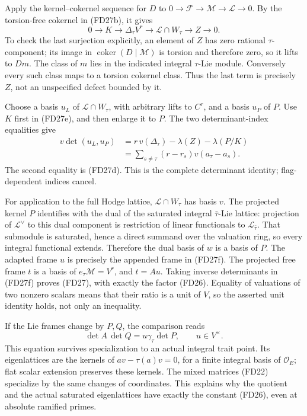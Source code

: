 Apply the kernel--cokernel sequence for \(D\) to
\(0\to\mathscr F\to\mathscr M\to\mathscr L\to0\).
By the torsion-free cokernel in (FD27b), it gives
\[
 0\to K\to\Delta_\tau V^r
          \to\mathscr L\cap W_\tau\to Z\to0 .
 \tag{FD27e}
\]
To check the last surjection explicitly, an element of \(Z\)
has zero rational \(\tau\)-component; its image in
\(\operatorname{coker}(D\mid\mathscr M)\) is torsion and
therefore zero, so it lifts to \(D m\).
The class of \(m\) lies in the indicated integral
\(\tau\)-Lie module.
Conversely every such class maps to a torsion cokernel class.
Thus the last term is precisely \(Z\), not an unspecified
defect bounded by it.

Choose a basis \(u_L\) of \(\mathscr L\cap W_\tau\), with
arbitrary lifts to \(C^r\), and a basis \(u_P\) of \(P\).
Use \(K\) first in (FD27e), and then enlarge it to \(P\).
The two determinant-index equalities give
\[
 \begin{split}
 v\det(u_L,u_P)
  &=r\,v(\Delta_\tau)-\lambda(Z)-\lambda(P/K)\\
  &=\sum_{s\ne\tau}(r-r_s)v(a_\tau-a_s).
 \end{split}
 \tag{FD27f}
\]
The second equality is (FD27d).  This is the complete
determinant identity; flag-dependent indices cancel.

For application to the full Hodge lattice,
\(\mathscr L\cap W_\tau\) has basis \(v\).
The projected kernel \(P\) identifies with the dual of
the saturated integral \(\bar\tau\)-Lie lattice:
projection of \(\mathcal L^\vee\) to this dual component
is restriction of linear functionals to
\(\mathcal L_{\bar\tau}\).
That submodule is saturated, hence a direct summand over
the valuation ring, so every integral functional extends.
Therefore the dual basis of \(w\) is a basis of \(P\).
The adapted frame \(u\) is precisely the appended frame
in (FD27f).  The projected free frame \(t\) is a basis of
\(e_\tau\mathscr M=V^r\), and \(t=A u\).
Taking inverse determinants in (FD27f) proves (FD27),
with exactly the factor (FD26).
Equality of valuations of two nonzero scalars means that
their ratio is a unit of \(V\), so the asserted unit
identity holds, not only an inequality.

If the Lie frames change by \(P,Q\), the comparison reads
\[
                   \det A\,\det Q
                             =u\gamma_\tau\det P,\qquad u\in V^\times .
 \tag{FD28}
\]
This equation survives specialization to an actual integral
trait point.  Its eigenlattices are the kernels of
\(av-\tau(a)v=0\), for a finite integral basis of
\(\mathcal O_E\); flat scalar extension preserves these kernels.
The mixed matrices (FD22) specialize by the same changes
of coordinates.  This explains why the quotient and the
actual saturated eigenlattices have exactly the constant
(FD26), even at absolute ramified primes.

